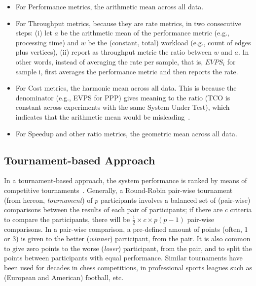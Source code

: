 \begin{itemize}
	\item For Performance metrics, the arithmetic mean across all data.
	\item For Throughput metrics, because they are rate metrics, in two consecutive steps: (i) let $a$ be the arithmetic mean of the performance metric (e.g., processing time) and $w$ be the (constant, total) workload (e.g., count of edges plus vertices), (ii) report as throughput metric the ratio between $w$ and $a$. In other words, instead of averaging the rate per sample, that is, $EVPS_i$ for sample i, \toolname{} first averages the performance metric and then reports the rate.
	\item For Cost metrics, the harmonic mean across all data. This is because the denominator (e.g., EVPS for PPP) gives meaning to the ratio (TCO is constant across experiments with the same System Under Test), which indicates that the arithmetic mean would be misleading~\cite[S.3.1.1]{DBLP:conf/sc/HoeflerB15}.
	\item For Speedup and other ratio metrics, the geometric mean across all data.
\end{itemize}








\subsection{Tournament-based Approach} \label{sec:competitions:tournament}
In a tournament-based approach, the system performance is ranked by means of competitive tournaments~\cite{Thurstone1927}.  Generally, a Round-Robin pair-wise tournament~\cite{David1960} (from hereon, {\it tournament}) of $p$ participants involves a balanced set of (pair-wise) comparisons between the results of each pair of participants; if there are $c$ criteria to compare the participants, there will be $\frac{1}{2} \times c \times p (p - 1)$ pair-wise comparisons. In a pair-wise comparison, a pre-defined amount of points (often, 1 or 3) is given to the better ({\it winner}) participant, from the pair. It is also common to give zero points to the worse ({\it loser}) participant, from the pair, and to split the points between participants with equal performance. Similar tournaments have been used for decades in chess competitions, in professional sports leagues such as (European and American) football, etc.

